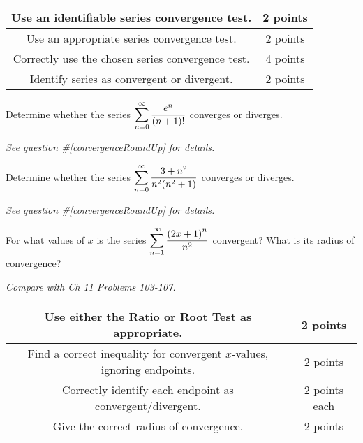 \documentclass[12pt]{exam}
\newcommand{\ds}{\ensuremath{\displaystyle}}
\begin{document}
\begin{questions}
\begin{center}
  \begin{tabular}{|c|c|}
    \hline
    Use an identifiable series convergence test. & 2 points \\
    \hline
    Use an appropriate series convergence test. & 2 points \\
    \hline
    Correctly use the chosen series convergence test. & 4 points \\
    \hline
    Identify series as convergent or divergent. & 2 points \\
    \hline
  \end{tabular}
\end{center}

\vfill

\newpage

\question[10]
Determine whether the series
$\ds \sum_{n = 0}^{\infty} \frac{e^n}{(n+1)!}$
converges or diverges.

\textit{See question \#\ref{convergenceRoundUp} for details.}

\vfill

\newpage

\question[10]
Determine whether the series
$\ds \sum_{n = 0}^{\infty} \frac{3+n^2}{n^2(n^2+1)}$
converges or diverges.

\textit{See question \#\ref{convergenceRoundUp} for details.}

\vfill

\newpage

\question[10]
For what values of $x$ is the series
$\ds \sum_{n=1}^{\infty} \frac{\left(2x+1\right)^n}{n^2}$ convergent?
What is its radius of convergence?

\textit{Compare with Ch 11 Problems 103-107.}

\begin{center}
  \begin{tabular}{|c|c|}
    \hline
    Use either the Ratio or Root Test as appropriate. & 2 points \\
    \hline
    Find a correct inequality for convergent $x$-values,
    ignoring endpoints. & 2 points \\
    \hline
    Correctly identify each endpoint as convergent/divergent. & 2 points each \\
    \hline
    Give the correct radius of convergence. & 2 points \\
    \hline
  \end{tabular}
\end{center}


\end{questions}
\end{document}
